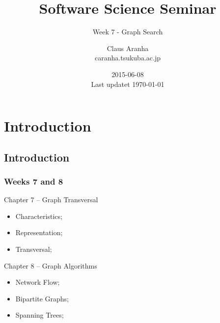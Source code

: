 \documentclass{beamer}
\title[]{Software Science Seminar}
\subtitle[]{Week 7 - Graph Search}
\author[Claus Aranha]{Claus Aranha\\{\footnotesize caranha\@@cs.tsukuba.ac.jp}}
\institute{College of Information Sciences}
\date{2015-06-08\\{\tiny Last updatet \today}}
\begin{document}
\section{Introduction}
\subsection{Introduction}

\begin{frame}
\maketitle
\end{frame}


\begin{frame}
  \frametitle{Weeks 7 and 8}
  \begin{block}{Chapter 7 -- Graph Transversal}
    \begin{itemize}
    \item Characteristics;
    \item Representation;
    \item Transversal;
    \end{itemize}
  \end{block}
  \begin{block}{Chapter 8 -- Graph Algorithms}
    \begin{itemize}
    \item Network Flow;
    \item Bipartite Graphs;
    \item Spanning Trees;
    \end{itemize}
  \end{block}
\end{frame}
\end{document}
